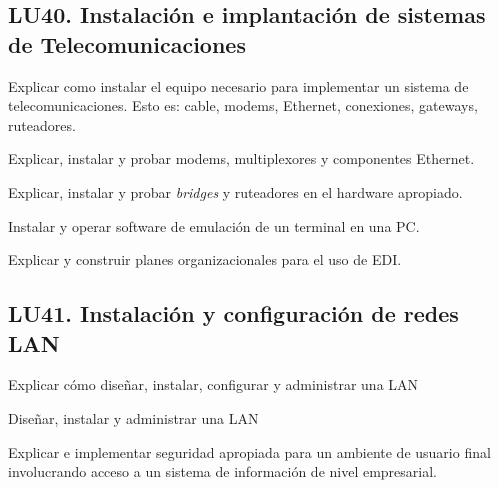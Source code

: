 \subsection{LU40. Instalación e implantación de sistemas de Telecomunicaciones}\label{sec:LU40}
\begin{LearningUnit}
\begin{LUGoal}
\item Explicar como instalar el equipo necesario para implementar un sistema de telecomunicaciones. Esto es: cable, modems, Ethernet, conexiones, gateways, ruteadores.
\end{LUGoal}

\begin{LUObjective}
\item Explicar, instalar y probar modems, multiplexores y componentes Ethernet.
\item Explicar, instalar y probar {\it bridges} y ruteadores en el hardware apropiado.
\item Instalar y operar software de emulación de un terminal en una PC.
\item Explicar y construir planes organizacionales para el uso de EDI.
\end{LUObjective}
\end{LearningUnit}

\subsection{LU41. Instalación y configuración de redes LAN}\label{sec:LU41}
\begin{LearningUnit}
\begin{LUGoal}
\item Explicar cómo diseñar, instalar, configurar y administrar una LAN
\end{LUGoal}

\begin{LUObjective}
\item Diseñar, instalar y administrar una LAN
\item Explicar e implementar seguridad apropiada para un ambiente de usuario final involucrando acceso a un sistema de información de nivel empresarial.
\end{LUObjective}
\end{LearningUnit}

